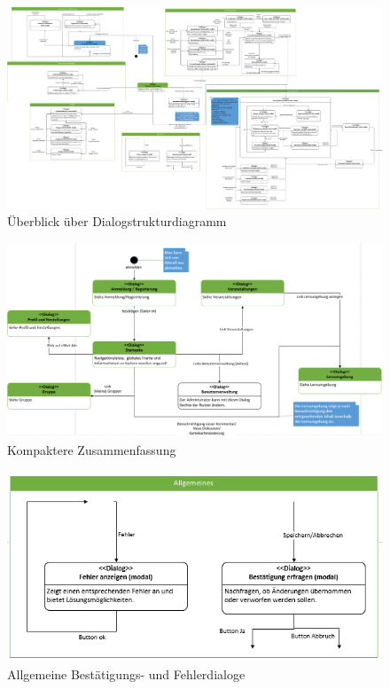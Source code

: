 \documentclass[12pt,a4paper]{article}
\begin{document}
{\begin{landscape}
\begin{figure}[H]
	\centering
	\includegraphics[width=18cm]{Bilder/Mockups/DSDGesamt.png}
	\caption{Überblick über Dialogstrukturdiagramm}
	\label{Dialogstrukturdiagramm}
\end{figure}

\begin{figure}[H]
	\centering
	\includegraphics[width=25cm]{Bilder/Mockups/DSDGesamtuebersicht.png}
	\caption{Kompaktere Zusammenfassung}
	\label{DialogstrukturdiagrammZusammenfassung}
\end{figure}
\begin{figure}[H]
	\centering
	\includegraphics[width=25cm]{Bilder/Mockups/DSDAllgemeines.png}
	\caption{Allgemeine Bestätigungs- und Fehlerdialoge}
	\label{DSDAllgemeines}
\end{figure}


\end{landscape}}
\end{document}
